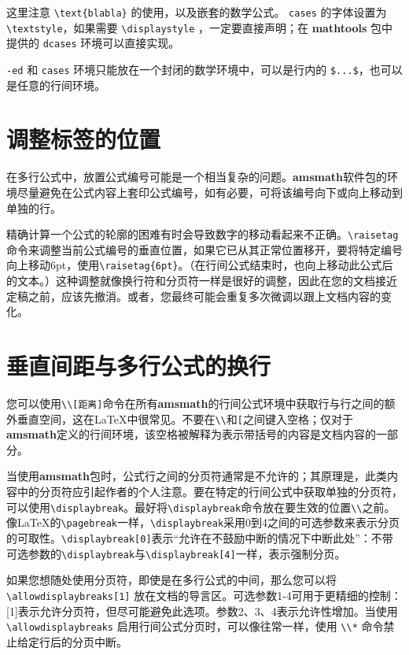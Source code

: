 \documentclass[openany]{ctexbook}
\begin{document}
这里注意 \verb|\text{blabla}| 的使用，以及嵌套的数学公式。 \verb|cases| 的字体设置为 \verb|\textstyle|，如果需要 \verb|\displaystyle| ，一定要直接声明；在 {\bfseries mathtools} 包中提供的 \verb|dcases| 环境可以直接实现。

\verb|-ed| 和 \verb|cases| 环境只能放在一个封闭的数学环境中，可以是行内的 \verb|$...$|，也可以是任意的行间环境。

\section{调整标签的位置}
在多行公式中，放置公式编号可能是一个相当复杂的问题。{\bfseries amsmath}软件包的环境尽量避免在公式内容上套印公式编号，如有必要，可将该编号向下或向上移动到单独的行。

精确计算一个公式的轮廓的困难有时会导致数字的移动看起来不正确。\verb|\raisetag|命令来调整当前公式编号的垂直位置，如果它已从其正常位置移开，要将特定编号向上移动6pt，使用\verb|\raisetag{6pt}|。（在行间公式结束时，也向上移动此公式后的文本。）这种调整就像换行符和分页符一样是很好的调整，因此在您的文档接近定稿之前，应该先撤消。或者，您最终可能会重复多次微调以跟上文档内容的变化。
\section{垂直间距与多行公式的换行}
您可以使用\verb|\\[距离]|命令在所有{\bfseries amsmath}的行间公式环境中获取行与行之间的额外垂直空间，这在\LaTeX 中很常见。不要在\verb|\\|和\verb|[|之间键入空格；仅对于{\bfseries amsmath}定义的行间环境，该空格被解释为表示带括号的内容是文档内容的一部分。

当使用{\bfseries amsmath}包时，公式行之间的分页符通常是不允许的；其原理是，此类内容中的分页符应引起作者的个人注意。要在特定的行间公式中获取单独的分页符，可以使用\verb|\displaybreak|。最好将\verb|\displaybreak|命令放在要生效的位置\verb|\\|之前。像\LaTeX 的\verb|\pagebreak|一样，\verb|\displaybreak|采用0到4之间的可选参数来表示分页的可取性。\verb|\displaybreak[0]|表示“允许在不鼓励中断的情况下中断此处”：不带可选参数的\verb|\displaybreak|与\verb|\displaybreak[4]|一样，表示强制分页。

如果您想随处使用分页符，即使是在多行公式的中间，那么您可以将\\ \verb|\allowdisplaybreaks[1]| 放在文档的导言区。可选参数1-4可用于更精细的控制：[1]表示允许分页符，但尽可能避免此选项。参数2、3、4表示允许性增加。当使用 \verb|\allowdisplaybreaks| 启用行间公式分页时，可以像往常一样，使用 \verb|\\*| 命令禁止给定行后的分页中断。
\end{document}
